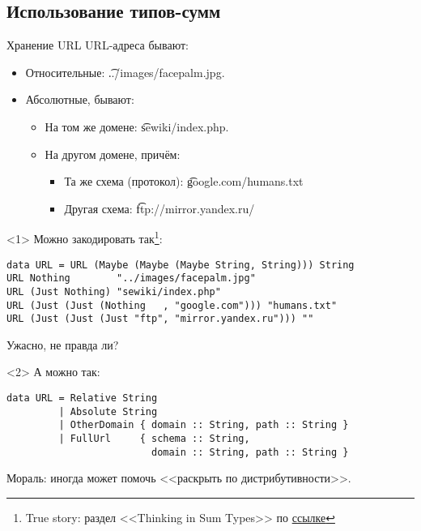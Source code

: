 \subsection{Использование типов-сумм}
\begin{frame}
\end{frame}

\begin{frame}[t,fragile]{Хранение URL}
	URL-адреса бывают:
	\begin{itemize}
		\item Относительные: \t{../images/facepalm.jpg}.
		\item Абсолютные, бывают:
			\begin{itemize}
				\item На том же домене: \t{sewiki/index.php}.
				\item На другом домене, причём:
					\begin{itemize}
						\item Та же схема (протокол): \t{google.com/humans.txt}
	                    \item Другая схема: \t{ftp://mirror.yandex.ru/}
                   	\end{itemize}
			\end{itemize}
	\end{itemize}
\begin{onlyenv}<1>
	Можно закодировать так\footnote{True story: раздел <<Thinking in Sum Types>> по \href{https://chadaustin.me/2015/07/sum-types/}{ссылке}}:
\begin{verbatim}
data URL = URL (Maybe (Maybe (Maybe String, String))) String
URL Nothing        "../images/facepalm.jpg"
URL (Just Nothing) "sewiki/index.php"
URL (Just (Just (Nothing   , "google.com"))) "humans.txt"
URL (Just (Just (Just "ftp", "mirror.yandex.ru"))) ""
\end{verbatim}
Ужасно, не правда ли?
\end{onlyenv}

\begin{onlyenv}<2>
А можно так:
\begin{verbatim}
data URL = Relative String
         | Absolute String
         | OtherDomain { domain :: String, path :: String }
         | FullUrl     { schema :: String,
                         domain :: String, path :: String }
\end{verbatim}
Мораль: иногда может помочь <<раскрыть по дистрибутивности>>.
\end{onlyenv}
\end{frame}
